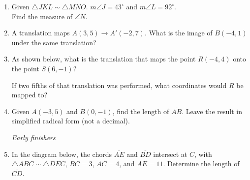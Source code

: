 \documentclass[12pt, twoside]{article}
\begin{document}
\begin{enumerate}
\newpage


  \item Given $\triangle JKL \sim \triangle MNO$. $m\angle J = 43^\circ$ and $m\angle L = 92^\circ$.\\
  Find the measure of $\angle N$. \vspace{1.5cm}

  \item A translation maps $A(3,5) \rightarrow A'(-2,7)$. What is the image of $B(-4,1)$ under the same translation?  \vspace{1.5cm}


  \item As shown below, what is the translation that maps the point $R(-4,4)$ onto the point $S(6, -1)$?
    \begin{center} %
    \end{center}
    If two fifths of that translation was performed, what coordinates would $R$ be mapped to? \vspace{2.5cm}

  \item Given $A(-3,5)$ and $B(0,-1)$, find the length of $\overline{AB}$. Leave the result in simplified radical form (not a decimal).

\newpage
\emph{Early finishers}
  \item In the diagram below, the chords $\overline{AE}$ and $\overline{BD}$ intersect at $C$, with $\triangle ABC \sim \triangle DEC$, $BC=3$, $AC=4$, and $AE=11$. Determine the length of $\overline{CD}$.
      \begin{center}
    \end{center}


\end{enumerate}
\end{document}
